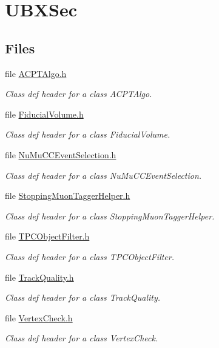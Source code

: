 \hypertarget{group__UBXSec}{\section{U\-B\-X\-Sec}
\label{group__UBXSec}
}
\subsection*{Files}
\begin{DoxyCompactItemize}
\item 
file \hyperlink{ACPTAlgo_8h}{A\-C\-P\-T\-Algo.\-h}
\begin{DoxyCompactList}\small\item\em Class def header for a class A\-C\-P\-T\-Algo. \end{DoxyCompactList}\item 
file \hyperlink{FiducialVolume_8h}{Fiducial\-Volume.\-h}
\begin{DoxyCompactList}\small\item\em Class def header for a class Fiducial\-Volume. \end{DoxyCompactList}\item 
file \hyperlink{NuMuCCEventSelection_8h}{Nu\-Mu\-C\-C\-Event\-Selection.\-h}
\begin{DoxyCompactList}\small\item\em Class def header for a class Nu\-Mu\-C\-C\-Event\-Selection. \end{DoxyCompactList}\item 
file \hyperlink{StoppingMuonTaggerHelper_8h}{Stopping\-Muon\-Tagger\-Helper.\-h}
\begin{DoxyCompactList}\small\item\em Class def header for a class Stopping\-Muon\-Tagger\-Helper. \end{DoxyCompactList}\item 
file \hyperlink{TPCObjectFilter_8h}{T\-P\-C\-Object\-Filter.\-h}
\begin{DoxyCompactList}\small\item\em Class def header for a class T\-P\-C\-Object\-Filter. \end{DoxyCompactList}\item 
file \hyperlink{TrackQuality_8h}{Track\-Quality.\-h}
\begin{DoxyCompactList}\small\item\em Class def header for a class Track\-Quality. \end{DoxyCompactList}\item 
file \hyperlink{VertexCheck_8h}{Vertex\-Check.\-h}
\begin{DoxyCompactList}\small\item\em Class def header for a class Vertex\-Check. \end{DoxyCompactList}\end{DoxyCompactItemize}
